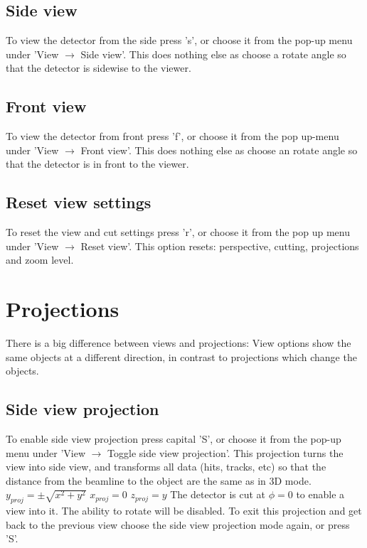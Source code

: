 \documentclass[a4paper,10pt]{article}
\begin{document}
\subsection{Side view}
To view the detector from the side press 's', or choose it from the pop-up menu under 'View $\rightarrow$ Side view'. This does nothing else as choose a rotate angle so that the detector is sidewise to the viewer.

\subsection{Front view}
To view the detector from front press 'f', or choose it from the pop up-menu under 'View $\rightarrow$ Front view'. This does nothing else as choose an rotate angle so that the detector is in front to the viewer.

\subsection{Reset view settings}
To reset the view and cut settings press 'r', or choose it from the pop up menu under 'View $\rightarrow$ Reset view'. This option resets: perspective, cutting, projections and zoom level.

\section{Projections}
There is a big difference between views and projections: View options show the same objects at a different direction, in contrast to projections which change the objects. 

\subsection{Side view projection}
To enable side view projection press capital 'S', or choose it from the pop-up menu under 'View $\rightarrow$ Toggle side view projection'. This projection turns the view into side view, and transforms all data (hits, tracks, etc) so that the distance from the beamline to the object are the same as in 3D mode.
\newline\newline
$y_{proj} = \pm \sqrt{x^2 + y^2}$\newline
$x_{proj}=0$\newline
$z_{proj} = y$ \newline
\newline
The detector is cut at $\phi=0$ to enable a view into it. The ability to rotate will be disabled. To exit this projection and get back to the previous view choose the side view projection mode again, or press 'S'. 
\end{document}
